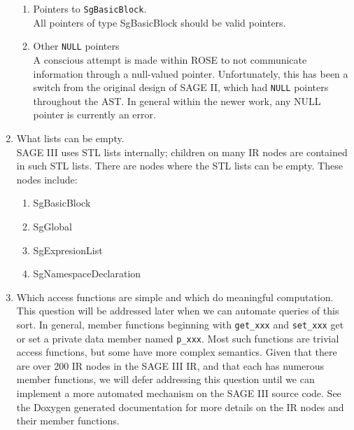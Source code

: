 \begin{enumerate}
\begin{enumerate}
          \item Pointers to {\tt SgBasicBlock}. \\
               All pointers of type SgBasicBlock should be valid pointers.

          \item Other {\tt NULL} pointers \\
               A conscious attempt is made within ROSE to not communicate information
               through a null-valued pointer.  Unfortunately, this has been a 
               switch from the original design of SAGE II, which had {\tt NULL} pointers
               throughout the AST.  In general within the newer work, any NULL pointer is
               currently an error.
     \end{enumerate}

     \item What lists can be empty. \\
          SAGE III uses STL lists internally; children on many IR nodes are contained
          in such STL lists.  There are nodes where the STL lists can be empty.  These 
          nodes include:
     \begin{enumerate}
          \item SgBasicBlock
          \item SgGlobal
          \item SgExpresionList
          \item SgNamespaceDeclaration
     \end{enumerate}

     \item Which access functions are simple and which do meaningful computation. \\
          This question will be addressed later when we can automate queries of this sort.
          In general, member functions beginning with {\tt get\_xxx} and {\tt set\_xxx}
          get or set a private data member named {\tt p\_xxx}.  Most such functions are
          trivial access functions, but some have more complex semantics.  Given that
          there are over 200 IR nodes in the SAGE III IR, and that each has numerous
          member functions, we will defer addressing this question until we can implement
          a more automated mechanism on the SAGE III source code. 
          See the Doxygen generated documentation for more details on the IR
          nodes and their member functions.
\end{enumerate}


